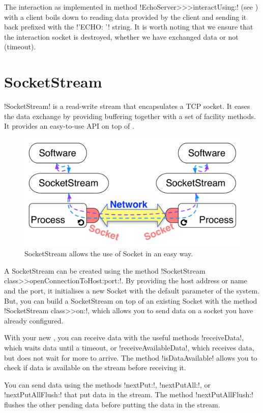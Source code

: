 \documentclass[a4paper,10pt,twoside]{book}
\begin{document}
The interaction as implemented in method \ct!EchoServer>>>interactUsing:! (see ) with a client boils down to reading data provided by the client and sending it back prefixed with the \ct!'ECHO: '! string.
It is worth noting that we ensure that the interaction socket is destroyed, whether we have exchanged data or not (timeout).


\section{SocketStream} 
\label{sec:socketStream}
\ct!SocketStream! is a read-write stream that encapsulates a TCP socket.
It eases the data exchange by providing buffering together with a set of facility methods. It provides an easy-to-use API on top of . 


\begin{figure}[ht]\centering
	\includegraphics[width=.75\linewidth]{socketStream}
	\caption{SocketStream allows the use of Socket in an easy way.}
	\label{fig:socketStream}
\end{figure}

A SocketStream can be created using the method \ct!SocketStream class>>openConnectionToHost:port:!. By providing the host address or name and the port, it initialises a new Socket with the default parameter of the system.
But, you can build a SocketStream on top of an existing Socket with the method \ct!SocketStream class>>on:!, which allows you to send data on a socket you have already configured. 

With your new , you can receive data with the useful methods \ct!receiveData!, which waits data until a timeout, or \ct!receiveAvailableData!, which receives data, but does not wait for more to arrive. The method \ct!isDataAvailable! allows you to check if data is available on the stream before receiving it.

You can send data using the methods \ct!nextPut:!, \ct!nextPutAll:!, or \ct!nextPutAllFlush:! that put data in the stream. The method \ct!nextPutAllFlush:! flushes the other pending data before putting the data in the stream.
\end{document}
